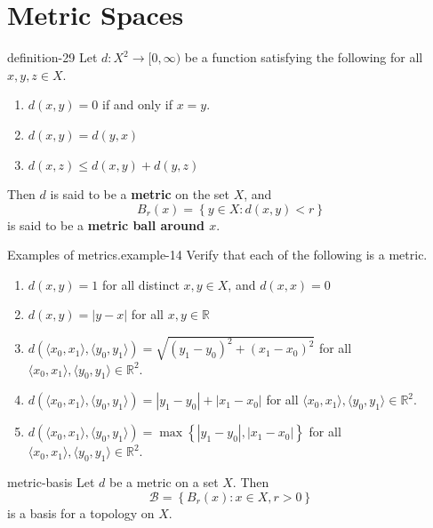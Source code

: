 \documentclass[10pt,]{article}
\newcommand{\terminology}[1]{\textbf{#1}}
\newcommand{\tuple}[1]{\langle #1 \rangle}
\newcommand{\mb}{\mathbb}
\newcommand{\mc}{\mathcal}
\newcommand{\setBuilder}[2]{\left\{#1:#2\right\}}
\newcommand{\setList}[1]{\left\{#1\right\}}
\newcommand{\lt}{<}
\begin{document}
\section[{Metric Spaces}]{Metric Spaces}\label{section-metric}
\begin{definition}{}{definition-29}%
\hypertarget{p-103}{}%
Let \(d:X^2\to[0,\infty)\) be a function satisfying the following for all \(x,y,z\in X\).%
\leavevmode%
\begin{enumerate}
\item\hypertarget{li-93}{}\(d(x,y)=0\) if and only if \(x=y\).%
\item\hypertarget{li-94}{}\(d(x,y)=d(y,x)\)%
\item\hypertarget{li-95}{}\(d(x,z)\leq d(x,y)+d(y,z)\)%
\end{enumerate}
\hypertarget{p-104}{}%
Then \(d\) is said to be a \terminology{metric} on the set \(X\), and%
\begin{equation*}
B_r(x)=\setBuilder{y\in X}{d(x,y)\lt r}
\end{equation*}
is said to be a \terminology{metric ball around \(x\)}.%
\end{definition}
\begin{example}{Examples of metrics.}{example-14}%
\hypertarget{p-105}{}%
Verify that each of the following is a metric.%
\leavevmode%
\begin{enumerate}
\item\hypertarget{li-96}{}\(d(x,y)=1\) for all distinct \(x,y\in X\), and \(d(x,x)=0\)%
\item\hypertarget{li-97}{}\(d(x,y)=|y-x|\) for all \(x,y\in\mb R\)%
\item\hypertarget{li-98}{}\(d(\tuple{x_0,x_1},\tuple{y_0,y_1})=\sqrt{(y_1-y_0)^2+(x_1-x_0)^2}\) for all \(\tuple{x_0,x_1},\tuple{y_0,y_1}\in\mb R^2\).%
\item\hypertarget{li-99}{}\(d(\tuple{x_0,x_1},\tuple{y_0,y_1})=|y_1-y_0|+|x_1-x_0|\) for all \(\tuple{x_0,x_1},\tuple{y_0,y_1}\in\mb R^2\).%
\item\hypertarget{li-100}{}\(d(\tuple{x_0,x_1},\tuple{y_0,y_1})=\max\setList{|y_1-y_0|,|x_1-x_0|}\) for all \(\tuple{x_0,x_1},\tuple{y_0,y_1}\in\mb R^2\).%
\end{enumerate}
\end{example}
\begin{theorem}{}{}{metric-basis}%
\hypertarget{p-106}{}%
Let \(d\) be a metric on a set \(X\). Then%
\begin{equation*}
\mc B=\setBuilder{B_r(x)}{x\in X,r>0}
\end{equation*}
is a basis for a topology on \(X\).%
\end{theorem}
\end{document}
